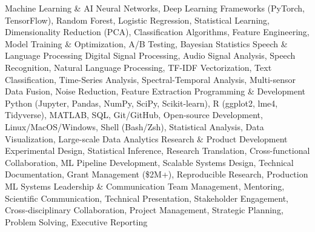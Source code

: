 
\begin{cvskills}

\cvskill
    {Machine Learning \& AI} %
    {Neural Networks, Deep Learning Frameworks (PyTorch, TensorFlow), Random Forest, Logistic Regression, Statistical Learning, Dimensionality Reduction (PCA), Classification Algorithms, Feature Engineering, Model Training \& Optimization, A/B Testing, Bayesian Statistics} %
\cvskill
    {Speech \& Language Processing} %
    {Digital Signal Processing, Audio Signal Analysis, Speech Recognition, Natural Language Processing, TF-IDF Vectorization, Text Classification, Time-Series Analysis, Spectral-Temporal Analysis, Multi-sensor Data Fusion, Noise Reduction, Feature Extraction} %
\cvskill
    {Programming \& Development} %
    {Python (Jupyter, Pandas, NumPy, SciPy, Scikit-learn), R (ggplot2, lme4, Tidyverse), MATLAB, SQL, Git/GitHub, Open-source Development, Linux/MacOS/Windows, Shell (Bash/Zsh), Statistical Analysis, Data Visualization, Large-scale Data Analytics} %
\cvskill
    {Research \& Product Development} %
    {Experimental Design, Statistical Inference, Research Translation, Cross-functional Collaboration, ML Pipeline Development, Scalable Systems Design, Technical Documentation, Grant Management (\$2M+), Reproducible Research, Production ML Systems} %
\cvskill
    {Leadership \& Communication} %
    {Team Management, Mentoring, Scientific Communication, Technical Presentation, Stakeholder Engagement, Cross-disciplinary Collaboration, Project Management, Strategic Planning, Problem Solving, Executive Reporting} %

\end{cvskills}
